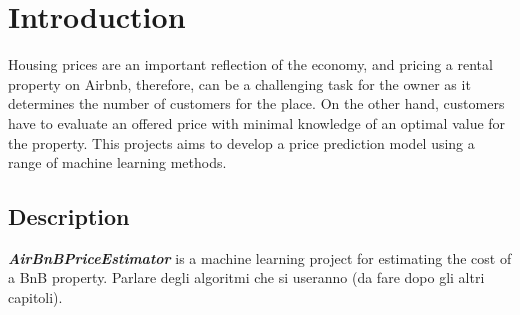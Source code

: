 \section{Introduction}
Housing prices are an important reflection of the economy, and pricing a rental property on Airbnb, therefore, can be a challenging task for the owner as it determines the number of customers for the place. On the other hand, customers have to evaluate an offered price with minimal knowledge of an optimal value for the property. This projects aims to develop a price prediction model using a range of machine learning methods.

\subsection{Description}
\textbf{\textit{AirBnBPriceEstimator}} is a machine learning project for estimating the cost of a BnB property.
Parlare degli algoritmi che si useranno (da fare dopo gli altri capitoli).

\medskip 
